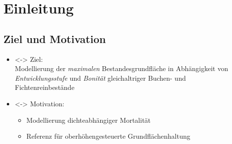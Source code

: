 

\section{Einleitung}
\subsection{Ziel und Motivation}

\begin{frame}[c]
  \begin{itemize}
  \item<\theFirstElement-> Ziel: \\
    Modellierung der \emph{maximalen} Bestandesgrundfläche in Abhängigkeit von \emph{Entwicklungsstufe} und \emph{Bonität} gleichaltriger Buchen- und Fichtenreinbestände
  \item<\theFirstElement-> Motivation:
    \begin{itemize}
    \item Modellierung dichteabhängiger Mortalität
    \item Referenz für oberhöhengesteuerte Grundflächenhaltung
    \end{itemize}
  \end{itemize}
\end{frame}

